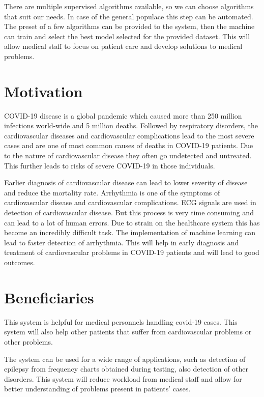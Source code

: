 There are multiple supervised algorithms available, so we can choose algorithms that suit our needs. In case of the general populace this step can be automated. The preset of a few algorithms can be provided to the system, then the machine can train and select the best model selected for the provided dataset. This will allow medical staff to focus on patient care and develop solutions to medical problems.

\section{Motivation} \label{sec:motivation}

COVID-19 disease is a global pandemic which caused more than 250 million infections world-wide and 5 million deaths. Followed by respiratory disorders, the cardiovascular diseases and cardiovascular complications lead to the most severe cases and are one of most common causes of deaths in COVID-19 patients. Due to the nature of cardiovascular disease they often go undetected and untreated. This further leads to risks of severe COVID-19 in those individuals.

Earlier diagnosis of cardiovascular disease can lead to lower severity of disease and reduce the mortality rate. Arrhythmia is one of the symptoms of cardiovascular disease and cardiovascular complications. ECG signals are used in detection of cardiovascular disease. But this process is very time consuming and can lead to a lot of human errors. Due to strain on the healthcare system this has become an incredibly difficult task. The implementation of machine learning can lead to faster detection of arrhythmia. This will help in early diagnosis and treatment of cardiovascular problems in COVID-19 patients and will lead to good outcomes.

\section{Beneficiaries} \label{sec:beneficiaries}

This system is helpful for medical personnels handling covid-19 cases. This system will also help other patients that suffer from cardiovascular problems or other problems.

The system can be used for a wide range of applications, such as detection of epilepsy from frequency charts obtained during testing, also detection of other disorders. This system will reduce workload from medical staff and allow for better understanding of problems present in patients' cases.

